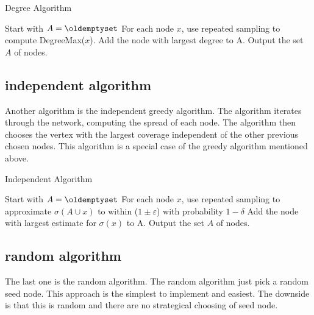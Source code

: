 {\begin{algorithm}
\caption{Degree Algorithm}
\begin{algorithmic}[1]
\State Start with $A = \oldemptyset$
\State For each node $x$, use repeated sampling to compute DegreeMax($x$).
\State Add the node with largest degree to A.
\EndWhile
\State Output the set $A$ of nodes.
\end{algorithmic}
\end{algorithm}

\subsection{independent algorithm}
Another algorithm is the independent greedy algorithm. The algorithm iterates through the network, computing the spread of each node. The algorithm then chooses the vertex with the largest coverage independent of the other previous chosen nodes. This algorithm is a special case of the greedy algorithm mentioned above.

\begin{algorithm}
\caption{Independent Algorithm}
\begin{algorithmic}[1]
\State Start with $A = \oldemptyset$
\State For each node $x$, use repeated sampling to approximate $\sigma(A \cup {x}) $ to within ($1 \pm \varepsilon$) with probability
$1 − \delta$
\State Add the node with largest estimate for $\sigma({x})$ to A.
\EndWhile
\State Output the set $A$ of nodes.
\end{algorithmic}
\end{algorithm}


\subsection{random algorithm}
The last one is the random algorithm. The random algorithm just pick a random seed node. This approach is the simplest to implement and easiest. The downside is that this is random and there are no strategical choosing of seed node. 

}
